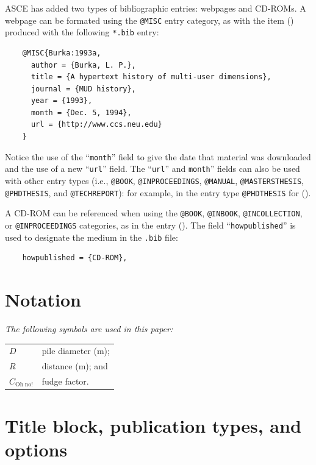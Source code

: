 \documentclass[NewProceedings, InsideFigs,LineNumbers]{asce-quarto}
\begin{document}
ASCE has added two types of bibliographic entries: webpages and CD-ROMs.
A webpage can be formated using the \texttt{@MISC} entry category, as
with the item () produced with the
following \texttt{*.bib} entry:

\begin{verbatim}
    @MISC{Burka:1993a,
      author = {Burka, L. P.},
      title = {A hypertext history of multi-user dimensions},
      journal = {MUD history},
      year = {1993},
      month = {Dec. 5, 1994},
      url = {http://www.ccs.neu.edu}
    }
\end{verbatim}

Notice the use of the ``\texttt{month}'' field to give the date that
material was downloaded and the use of a new ``\texttt{url}'' field. The
``\texttt{url}'' and \texttt{month}'' fields can also be used with other
entry types (i.e., \texttt{@BOOK}, \texttt{@INPROCEEDINGS},
\texttt{@MANUAL}, \texttt{@MASTERSTHESIS}, \texttt{@PHDTHESIS}, and
\texttt{@TECHREPORT}): for example, in the entry type
\texttt{@PHDTHESIS} for ().

A CD-ROM can be referenced when using the \texttt{@BOOK},
\texttt{@INBOOK}, \texttt{@INCOLLECTION}, or \texttt{@INPROCEEDINGS}
categories, as in the entry (). The field ``\texttt{howpublished}'' is used to designate
the medium in the \texttt{.bib} file:

\begin{verbatim}
    howpublished = {CD-ROM},
\end{verbatim}

\appendix

\section{Notation}\label{sec-app-notation}

\emph{The following symbols are used in this paper:}

\begin{longtable}[]{@{}ll@{}}
\toprule\noalign{}
\endhead
\bottomrule\noalign{}
\endlastfoot
\(D\) & pile diameter (m); \\
\(R\) & distance (m); and \\
\(C_{\mathrm{Oh\;no!}}\) & fudge factor. \\
\end{longtable}

\section{Title block, publication types, and
options}\label{sec-app-options}
\end{document}
